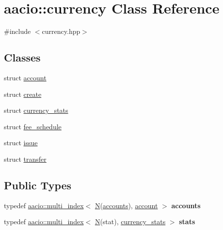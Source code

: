\hypertarget{classaacio_1_1currency}{}\section{aacio\+:\+:currency Class Reference}
\label{classaacio_1_1currency}


{\ttfamily \#include $<$currency.\+hpp$>$}

\subsection*{Classes}
\begin{DoxyCompactItemize}
\item 
struct \mbox{\hyperlink{structaacio_1_1currency_1_1account}{account}}
\item 
struct \mbox{\hyperlink{structaacio_1_1currency_1_1create}{create}}
\item 
struct \mbox{\hyperlink{structaacio_1_1currency_1_1currency__stats}{currency\+\_\+stats}}
\item 
struct \mbox{\hyperlink{structaacio_1_1currency_1_1fee__schedule}{fee\+\_\+schedule}}
\item 
struct \mbox{\hyperlink{structaacio_1_1currency_1_1issue}{issue}}
\item 
struct \mbox{\hyperlink{structaacio_1_1currency_1_1transfer}{transfer}}
\end{DoxyCompactItemize}
\subsection*{Public Types}
\begin{DoxyCompactItemize}
\item 
\mbox{\label{classaacio_1_1currency_a04a5fea44e840544e28aace59ffa3df7}} 
typedef \mbox{\hyperlink{classaacio_1_1multi__index}{aacio\+::multi\+\_\+index}}$<$ \mbox{\hyperlink{group__types_gaf9c1edb0e0da55ec6ba09f32f6839529}{N}}(\mbox{\hyperlink{classaacio_1_1multi__index}{accounts}}), \mbox{\hyperlink{structaacio_1_1currency_1_1account}{account}} $>$ {\bfseries accounts}
\item 
\mbox{\label{classaacio_1_1currency_a1f70ce92dbc27abac230b621782ffdf4}} 
typedef \mbox{\hyperlink{classaacio_1_1multi__index}{aacio\+::multi\+\_\+index}}$<$ \mbox{\hyperlink{group__types_gaf9c1edb0e0da55ec6ba09f32f6839529}{N}}(stat), \mbox{\hyperlink{structaacio_1_1currency_1_1currency__stats}{currency\+\_\+stats}} $>$ {\bfseries stats}
\end{DoxyCompactItemize}
